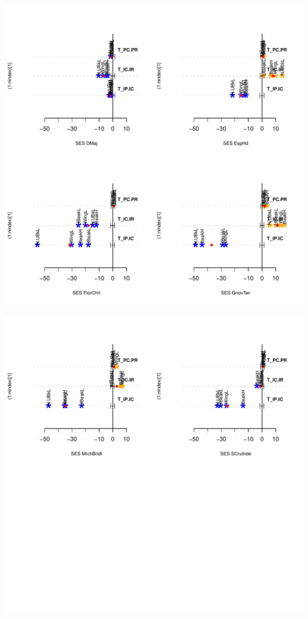 \documentclass[12pt]{article}\usepackage[]{graphicx}\usepackage[]{color}
\makeatletter
\def\maxwidth{ %
  \ifdim\Gin@nat@width>\linewidth
    \linewidth
  \else
    \Gin@nat@width
  \fi
}
\newenvironment{knitrout}{}{} %
\makeatother
\begin{document}
\begin{knitrout}
{\centering \includegraphics[width=\maxwidth]{figure/unnamed-chunk-362} 

}




{\centering \includegraphics[width=\maxwidth]{figure/unnamed-chunk-363} 

}
\end{knitrout}
\end{document}
